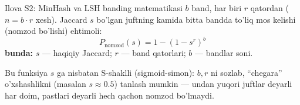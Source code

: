 \documentclass[aspectratio=169,11pt]{beamer}
\newcommand{\bunda}[1]{{\small\textbf{bunda:}\; #1}}
\begin{document}
\begin{frame}{Ilova S2: MinHash va LSH banding matematikasi}
  \small
  $b$ band, har biri $r$ qatordan ($n=b\cdot r$ xesh). Jaccard $s$ bo'lgan
  juftning kamida bitta bandda to'liq mos kelishi (nomzod bo'lishi) ehtimoli:
  $$ P_{\text{nomzod}}(s) = 1 - (1 - s^{r})^{b} $$
  \bunda{$s$ --- haqiqiy Jaccard; $r$ --- band qatorlari; $b$ --- bandlar soni.}
  \vspace{3pt}

  Bu funksiya $s$ ga nisbatan S-shaklli (sigmoid-simon): $b,r$ ni sozlab,
  ``chegara'' o'xshashlikni (masalan $s\approx 0.5$) tanlash mumkin ---
  undan yuqori juftlar deyarli har doim, pastlari deyarli hech qachon
  nomzod bo'lmaydi.
\end{frame}
\end{document}
